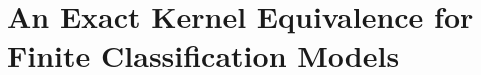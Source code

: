 \section{An Exact Kernel Equivalence for Finite Classification Models} %
\label{Chapter4} %








